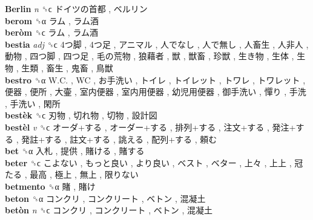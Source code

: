 \textbf{Berlin} \emph{n}  ␝ϲ   ドイツの首都 ,  ベルリン   \\
\textbf{berom} ␝α   ラム ,  ラム酒   \\
\textbf{beròm} ␝ϲ   ラム ,  ラム酒   \\
\textbf{bestia} \emph{adj}  ␝ϲ   4つ脚 ,  4つ足 ,  アニマル ,  人でなし ,  人で無し ,  人畜生 ,  人非人 ,  動物 ,  四つ脚 ,  四つ足 ,  毛の荒物 ,  狼藉者 ,  獣 ,  獣畜 ,  珍獣 ,  生き物 ,  生体 ,  生物 ,  生類 ,  畜生 ,  鬼畜 ,  鳥獣   \\
\textbf{bestro} ␝α   W.C. ,  WC ,  お手洗い ,  トイレ ,  トイレット ,  トワレ ,  トワレット ,  便器 ,  便所 ,  大壷 ,  室内便器 ,  室内用便器 ,  幼児用便器 ,  御手洗い ,  憚り ,  手洗 ,  手洗い ,  閑所   \\
\textbf{bestèk} ␝ϲ   刃物 ,  切れ物 ,  切物 ,  設計図   \\
\textbf{bestèl} \emph{v}  ␝ϲ   オーダ+する ,  オーダー+する ,  排列+する ,  注文+する ,  発注+する ,  発註+する ,  註文+する ,  誂える ,  配列+する ,  頼む   \\
\textbf{bet} ␝α   入札 ,  提供 ,  賭ける ,  賭する   \\
\textbf{beter} ␝ϲ   こよない ,  もっと良い ,  より良い ,  ベスト ,  ベター ,  上々 ,  上上 ,  冠たる ,  最高 ,  極上 ,  無上 ,  限りない   \\
\textbf{betmento} ␝α   賭 ,  賭け   \\
\textbf{beton} ␝α   コンクリ ,  コンクリート ,  ベトン ,  混凝土   \\
\textbf{betòn} \emph{n}  ␝ϲ   コンクリ ,  コンクリート ,  ベトン ,  混凝土   \\
